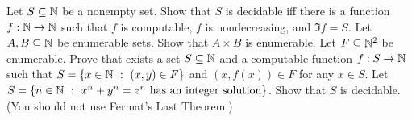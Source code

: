\begin{chapterendexercises}
  \exercise[recommended] Let $S \subseteq {\mathbb{N}}$ be a nonempty set.
    Show that $S$ is decidable iff there is a function $f : {\mathbb{N}} \to {\mathbb{N}}$ such
    that $f$ is computable, $f$ is nondecreasing, and $\Im{f} = S$.
  \exercise Let $A, B \subseteq {\mathbb{N}}$ be enumerable sets. Show that
    $A \times B$ is enumerable.
  \exercise Let $F \subseteq {\mathbb{N}}^2$ be enumerable. Prove that exists a
    set $S \subseteq {\mathbb{N}}$ and a computable function $f: S \to {\mathbb{N}}$ such that
    $S = \set[(x, y) \in F]{x \in \N}$ and $(x, f(x)) \in F$ for any $x \in S$.
  \exercise
    Let $S =
      \set[
        x^n + y^n = z^n \text{ has an integer solution}
      ]{n \in \N}$. Show that $S$ is decidable.
      (You should not use Fermat's Last Theorem.)
\end{chapterendexercises}
